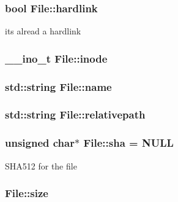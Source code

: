 \subsubsection[{\texorpdfstring{hardlink}{hardlink}}]{\setlength{\rightskip}{0pt plus 5cm}bool File\+::hardlink}\hypertarget{class_file_a77110ab18a54c978d72477ee49a0a4cd}{}\label{class_file_a77110ab18a54c978d72477ee49a0a4cd}
it\textquotesingle{}s alread a hardlink 
\subsubsection[{\texorpdfstring{inode}{inode}}]{\setlength{\rightskip}{0pt plus 5cm}\+\_\+\+\_\+ino\+\_\+t File\+::inode}\hypertarget{class_file_a9dadadf265382acd3ac5ca840829b6a6}{}\label{class_file_a9dadadf265382acd3ac5ca840829b6a6}
\subsubsection[{\texorpdfstring{name}{name}}]{\setlength{\rightskip}{0pt plus 5cm}std\+::string File\+::name}\hypertarget{class_file_ac219294b38d3a3a422ad6ebacb041bb5}{}\label{class_file_ac219294b38d3a3a422ad6ebacb041bb5}
\subsubsection[{\texorpdfstring{relativepath}{relativepath}}]{\setlength{\rightskip}{0pt plus 5cm}std\+::string File\+::relativepath}\hypertarget{class_file_a2a3000e706022e1a6e37415ac3984884}{}\label{class_file_a2a3000e706022e1a6e37415ac3984884}
\subsubsection[{\texorpdfstring{sha}{sha}}]{\setlength{\rightskip}{0pt plus 5cm}unsigned char$\ast$ File\+::sha = N\+U\+LL}\hypertarget{class_file_ad44605a92eebe23c5738b0d64fdca7e1}{}\label{class_file_ad44605a92eebe23c5738b0d64fdca7e1}
S\+H\+A512 for the file 
\subsubsection[{\texorpdfstring{size}{size}}]{ File\+::size}\hypertarget{class_file_aa2ef804960a60130c63406db420e9cdc}{}\label{class_file_aa2ef804960a60130c63406db420e9cdc}
